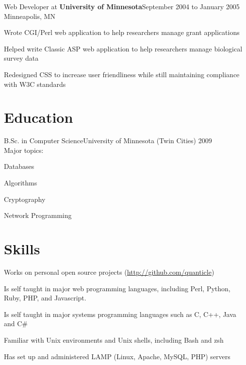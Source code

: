 \documentclass[letterpaper]{article}
\newenvironment{resume-list}
{\begin{itemize}
 \setlength{\itemsep}{0pt}
 \setlength{\parskip}{0pt}}
{\end{itemize}}
\begin{document}
\noindent Web Developer at {\bfseries University of Minnesota}\dotfill September 2004 to January 2005\\
Minneapolis, MN
\begin{resume-list}
\item Wrote CGI/Perl web application to help researchers manage grant applications
\item Helped write Classic ASP web application to help researchers manage biological survey data
\item Redesigned CSS to increase user friendliness while still maintaining compliance with W3C standards
\end{resume-list}
\section*{Education}
\noindent B.Sc. in Computer Science\dotfill University of Minnesota (Twin Cities) 2009\\
Major topics:
\begin{resume-list}
\item Databases
\item Algorithms
\item Cryptography
\item Network Programming
\end{resume-list}
\section*{Skills}
\begin{resume-list}
\item Works on personal open source projects (\url{http://github.com/quanticle})
\item Is self taught in major web programming languages, including Perl, Python, Ruby, PHP, and Javascript.
\item Is self taught in major systems programming languages such as C, C++, Java and C\#
\item Familiar with Unix environments and Unix shells, including Bash and zsh
\item Has set up and administered LAMP (Linux, Apache, MySQL, PHP) servers
\end{resume-list}
\end{document}

